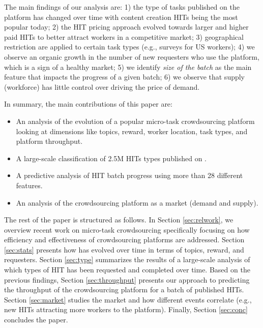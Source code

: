 The main findings of our analysis are: 1) the type of tasks published on the platform has changed over time with content creation HITs being the most popular today; 2) the HIT pricing approach evolved towards larger and higher paid HITs to better attract workers in a competitive market; 3) geographical restriction are applied to certain task types (e.g., surveys for US workers); 4) we observe an organic growth in the number of new requesters who use the platform, which is a sign of a healthy market; 5) we identify \emph{size of the batch} as the main feature that impacts the progress of a given batch; 6) we observe that supply (workforce) has little control over driving the price of demand.

In summary, the main contributions of this paper are:
\begin{itemize}[noitemsep,topsep=0pt,parsep=0pt,partopsep=0pt]

	\item An analysis of the evolution of a popular micro-task crowdsourcing platform looking at dimensions like topics, reward, worker location, task types, and platform throughput.

	\item A large-scale classification of 2.5M HITs types published on \amt{}.

	\item A predictive analysis of HIT batch progress using more than 28 different features.
	
	\item An analysis of the crowdsourcing platform as a market (demand and supply).
	
\end{itemize}


The rest of the paper is structured as follows.
In Section \ref{sec:relwork}, we overview recent work on micro-task crowdsourcing specifically focusing on how  efficiency and effectiveness  of crowdsourcing platforms are addressed.
Section \ref{sec:stats} presents how \amt{} has evolved over time in terms of topics, reward, and requesters.
Section \ref{sec:type} summarizes the results of a large-scale analysis of which types of HIT has been requested and completed over time.
Based on the previous findings, Section \ref{sec:throughput} presents our approach to predicting the throughput of the crowdsourcing platform for a batch of published HITs.
Section \ref{sec:market} studies the \amt{} market and how different events correlate (e.g., new HITs attracting more workers to the platform).
Finally, Section \ref{sec:conc} concludes the paper.

